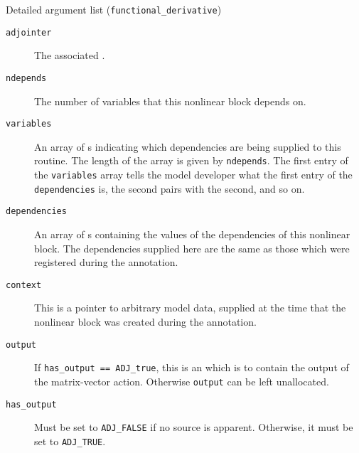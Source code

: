 \begin{boxwithtitle}{Detailed argument list (\texttt{functional_derivative})}
\begin{description}
\item[\texttt{adjointer}] The associated .
\item[\texttt{ndepends}] The number of variables that this nonlinear block depends on.
\item[\texttt{variables}] An array of s indicating which dependencies are being supplied to this routine. The length of the
array is given by \texttt{ndepends}. The first entry of the \texttt{variables} array
tells the model developer what the first entry of the \texttt{dependencies} is, the second pairs with the second, and so on.
\item[\texttt{dependencies}] An array of s containing the values of the dependencies of this nonlinear block. The dependencies supplied
here are the same as those which were registered during the annotation.
\item[\texttt{context}] This is a pointer to arbitrary model data, supplied at the time that the nonlinear block was created during the annotation.
\item[\texttt{output}] If \texttt{has_output == ADJ_true}, this is an  which is to contain the output of the matrix-vector action. Otherwise \texttt{output} can be left unallocated.
\item[\texttt{has_output}] Must be set to \texttt{ADJ_FALSE} if no source is apparent. Otherwise, it must be set to \texttt{ADJ_TRUE}.
\end{description}
\end{boxwithtitle}
